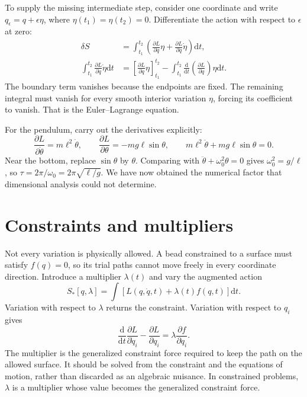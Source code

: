 \documentclass[11pt,oneside]{book}
\newcommand{\dd}{\mathrm{d}}
\newcommand{\pd}[2]{\frac{\partial #1}{\partial #2}}
\newcommand{\od}[2]{\frac{\dd #1}{\dd #2}}
\theoremstyle{reviewstyle}
\begin{document}
To supply the missing intermediate step, consider one coordinate and write $q_\epsilon=q+\epsilon\eta$, where $\eta(t_1)=\eta(t_2)=0$. Differentiate the action with respect to $\epsilon$ at zero:
\begin{align}
\delta S&=\int_{t_1}^{t_2}\left(\pd Lq\eta+\pd L{\dot q}\dot\eta\right)\dd t,\\
\int_{t_1}^{t_2}\pd L{\dot q}\dot\eta\dd t
&=\left[\pd L{\dot q}\eta\right]_{t_1}^{t_2}
-\int_{t_1}^{t_2}\od{}{t}\left(\pd L{\dot q}\right)\eta\dd t.
\end{align}
The boundary term vanishes because the endpoints are fixed. The remaining integral must vanish for every smooth interior variation $\eta$, forcing its coefficient to vanish. That is the Euler--Lagrange equation.

For the pendulum, carry out the derivatives explicitly:
\begin{equation}
\pd L{\dot\theta}=m\ell^2\dot\theta,\qquad
\pd L\theta=-mg\ell\sin\theta,
\qquad m\ell^2\ddot\theta+mg\ell\sin\theta=0.
\end{equation}
Near the bottom, replace $\sin\theta$ by $\theta$. Comparing with $\ddot\theta+\omega_0^2\theta=0$ gives $\omega_0^2=g/\ell$, so $\tau=2\pi/\omega_0=2\pi\sqrt{\ell/g}$. We have now obtained the numerical factor that dimensional analysis could not determine.

\section{Constraints and multipliers}
Not every variation is physically allowed. A bead constrained to a surface must satisfy $f(q)=0$, so its trial paths cannot move freely in every coordinate direction. Introduce a multiplier $\lambda(t)$ and vary the augmented action
\begin{equation}
S_*[q,\lambda]=\int\left[L(q,\dot q,t)+\lambda(t)f(q,t)\right]\dd t.
\end{equation}
Variation with respect to $\lambda$ returns the constraint. Variation with respect to $q_i$ gives
\begin{equation}
\od{}{t}\pd{L}{\dot q_i}-\pd{L}{q_i}=\lambda\pd{f}{q_i}.
\end{equation}
The multiplier is the generalized constraint force required to keep the path on the allowed surface. It should be solved from the constraint and the equations of motion, rather than discarded as an algebraic nuisance. In constrained problems, $\lambda$ is a multiplier whose value becomes the generalized constraint force.
\end{document}
